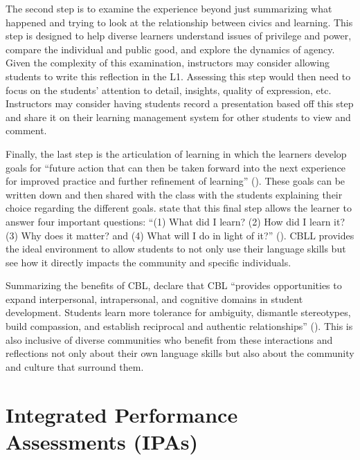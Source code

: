 \documentclass[output=paper]{langscibook}
\begin{document}
The second step is to examine the experience beyond just summarizing what happened and trying to look at the relationship between civics and learning. This step is designed to help diverse learners understand issues of privilege and power, compare the individual and public good, and explore the dynamics of agency. Given the complexity of this examination, instructors may consider allowing students to write this reflection in the L1. Assessing this step would then need to focus on the students’ attention to detail, insights, quality of expression, etc. Instructors may consider having students record a presentation based off this step and share it on their learning management system for other students to view and comment.

Finally, the last step is the articulation of learning in which the learners develop goals for “future action that can then be taken forward into the next experience for improved practice and further refinement of learning” (\citeyear[42]{AshClayton2009}). These goals can be written down and then shared with the class with the students explaining their choice regarding the different goals. \citet{CliffordReisinger2019} state that this final step allows the learner to answer four important questions: “(1) What did I learn? (2) How did I learn it? (3) Why does it matter? and (4) What will I do in light of it?” (\citeyear[71]{CliffordReisinger2019}). CBLL provides the ideal environment to allow students to not only use their language skills but see how it directly impacts the community and specific individuals.

Summarizing the benefits of CBL, \citet{CliffordReisinger2019} declare that CBL “provides opportunities to expand interpersonal, intrapersonal, and cognitive domains in student development. Students learn more tolerance for ambiguity, dismantle stereotypes, build compassion, and establish reciprocal and authentic relationships” (\citeyear[28--29]{CliffordReisinger2019}). This is also inclusive of diverse communities who benefit from these interactions and reflections not only about their own language skills but also about the community and culture that surround them.

\section{Integrated Performance Assessments (IPAs)}
\end{document}
